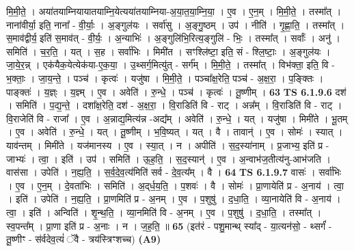 \documentclass[17pt]{extarticle}
\begin{document}
                  मि॒मी॒ते॒ । अया॑तयाम्नियायातयाम्नि॒येत्यया॑तयाम्निया-अ॒या॒त॒या॒म्नि॒या॒ । ए॒व । ए॒न॒म् । मि॒मी॒ते॒ । तस्मा᳚त् । नाना॑वीर्या॒ इति॒ नाना᳚ - वी॒र्याः॒ । अ॒ङ्गुल॑यः । सर्वा॑सु । अ॒ङ्गु॒ष्ठम् । उप॑ । नीति॑ । गृ॒ह्णा॒ति॒ । तस्मा᳚त् । स॒माव॑द्वीर्य॒ इति॑ स॒माव॑त् - वी॒र्यः॒ । अ॒न्याभिः॑ । अ॒ङ्गुलि॑भि॒रित्य॒ङ्गुलि॑ - भिः॒ । तस्मा᳚त् । सर्वाः᳚ । अनु॑ । समिति॑ । च॒र॒ति॒ । यत् । स॒ह । सर्वा॑भिः । मिमी॑त । सꣳश्लि॑ष्टा॒ इति॒ सं - श्लि॒ष्टाः॒ । अ॒ङ्गुल॑यः । जा॒ये॒र॒न्न् । एक॑यैक॒येत्येक॑या-ए॒क॒या॒ । उ॒थ्सर्ग॒मित्यु॑त् - सर्ग᳚म् । मि॒मी॒ते॒ । तस्मा᳚त् । विभ॑क्ता॒ इति॒ वि - भ॒क्ताः॒ । जा॒य॒न्ते॒ । पञ्च॑ । कृत्वः॑ । यजु॑षा । मि॒मी॒ते॒ । पञ्चा᳚क्ष॒रेति॒ पञ्च॑ - अ॒क्ष॒रा॒ । प॒ङ्क्तिः । पाङ्क्तः॑ । य॒ज्ञ्ः । य॒ज्ञ्म् । ए॒व । अवेति॑ । रु॒न्धे॒ । पञ्च॑ । कृत्वः॑ । तू॒ष्णीम् । \textbf{  63} \newline
                  \newline
                                \textbf{ TS 6.1.9.6} \newline
                  दश॑ । समिति॑ । प॒द्य॒न्ते॒ । दशा᳚क्ष॒रेति॒ दश॑ - अ॒क्ष॒रा॒ । वि॒राडिति॑ वि - राट् । अन्न᳚म् । वि॒राडिति॑ वि - राट् । वि॒राजेति॑ वि - राजा᳚ । ए॒व । अ॒न्नाद्य॒मित्य॑न्न -अद्य᳚म् । अवेति॑ । रु॒न्धे॒ । यत् । यजु॑षा । मिमी॑ते । भू॒तम् । ए॒व । अवेति॑ । रु॒न्धे॒ । यत् । तू॒ष्णीम् । भ॒वि॒ष्यत् । यत् । वै । तावान्॑ । ए॒व । सोमः॑ । स्यात् । याव॑न्तम् । मिमी॑ते । यज॑मानस्य । ए॒व । स्या॒त् । न । अपीति॑ । स॒द॒स्या॑नाम् । प्र॒जाभ्य॒ इति॑ प्र - जाभ्यः॑ । त्वा॒ । इति॑ । उप॑ । समिति॑ । ऊ॒ह॒ति॒ । स॒द॒स्यान्॑ । ए॒व । अ॒न्वाभ॑ज॒तीत्य॑नु-आभ॑जति । वास॑सा । उपेति॑ । न॒ह्य॒ति॒ । स॒र्व॒दे॒व॒त्य॑मिति॑ सर्व - दे॒व॒त्य᳚म् । वै । \textbf{  64} \newline
                  \newline
                                \textbf{ TS 6.1.9.7} \newline
                  वासः॑ । सर्वा॑भिः । ए॒व । ए॒न॒म् । दे॒वता॑भिः । समिति॑ । अ॒द्‌र्ध॒य॒ति॒ । प॒शवः॑ । वै । सोमः॑ । प्रा॒णायेति॑ प्र - अ॒नाय॑ । त्वा॒ । इति॑ । उपेति॑ । न॒ह्य॒ति॒ । प्रा॒णमिति॑ प्र - अ॒नम् । ए॒व । प॒शुषु॑ । द॒धा॒ति॒ । व्या॒नायेति॑ वि - अ॒नाय॑ । त्वा॒ । इति॑ । अन्विति॑ । शृ॒न्थ॒ति॒ । व्या॒नमिति॑ वि - अ॒नम् । ए॒व । प॒शुषु॑ । द॒धा॒ति॒ । तस्मा᳚त् । स्व॒पन्त᳚म् । प्रा॒णा इति॑ प्र - अ॒नाः । न । ज॒ह॒ति॒ ॥ \textbf{  65} \newline
                  \newline
                      (इत॑रं - पशु॒मान्थ् स्या᳚द् - या॒त्यन॑सो॒ - थ्सर्गं॑ - तू॒ष्णीꣳ - स॑र्वदेव॒त्यं॑ ॅवै - त्रय॑स्त्रिꣳशच्च)  \textbf{(A9)} \newline \newline
\end{document}
